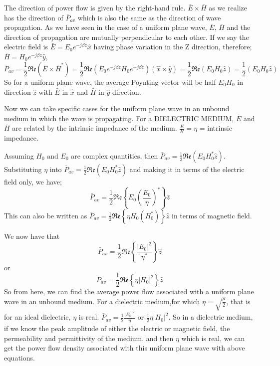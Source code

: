 The direction of power flow is given by the right-hand rule. $ \bar{E}\times\bar{H} $ as we realize has the direction of $ \bar{P}_{av} $ which is also the same as the direction of wave propagation. As we have seen in the case of a uniform plane wave, $ \bar{E} $, $ \bar{H} $ and the direction of propagation are mutually perpendicular to each other. If we say the electric field is $ \bar{E}=E_0e^{-j\beta z}\hat{x} $ having phase variation in the Z direction, therefore;
$ \bar{H}=H_0e^{-j\beta z}\hat{y} $,
\begin{dmath*}
\bar{P}_{av}=\frac{1}{2}\mathfrak{Re}(\bar{E}\times\bar{H}^{*})
=\frac{1}{2}\mathfrak{Re}(E_0e^{-j\beta z}H_0e^{+j\beta z})(\hat{x}\times\hat{y})
=\frac{1}{2}\mathfrak{Re}(E_0H_0\hat{z})=\frac{1}{2}(E_0H_0\hat{z}) 
\end{dmath*}
So for a uniform plane wave, the average Poynting vector will be half $ E_0H_0 $ in direction $ \hat{z} $ with $ \bar{E} $ in $ \hat{x} $ and $ \bar{H} $ in $ \hat{y} $ direction.

Now we can take specific cases for the uniform plane wave in an unbound medium in which the wave is propagating. For a DIELECTRIC MEDIUM, $ \bar{E} $ and $ \bar{H} $ are related by the intrinsic impedance of the medium.
$ \frac{E}{H}=\eta $ = intrinsic impedance.

Assuming $H_{0} \text{ and } E_{0}$ are complex quantities, then $\bar{P}_{av}=\frac{1}{2} \mathfrak{Re}(E_0H_0^{*}\hat{z}) $. Substituting $\eta$ into $ \bar{P}_{av}=\frac{1}{2} \mathfrak{Re}(E_0H_0^{*}\hat{z}) $ and making it in terms of the electric field only,  we have;
\begin{dmath*}
\bar{P}_{av}=\frac{1}{2} \mathfrak{Re}\left\{E_0(\frac{E_0}{\eta})^{*}\right\}\hat{z}  
\end{dmath*}
This can also be written as $ \bar{P}_{av}= \frac{1}{2}\mathfrak{Re}\left\{\eta H_0(H_0^{*})\right\}\hat{z} $ in terms of magnetic field.

We now have that 
\begin{dmath*}
\bar{P}_{av}=\frac{1}{2}\mathfrak{Re}\left\{\frac{|E_0|^{2}}{\eta^{*}}\right\}\hat{z}
\end{dmath*}
or 
\begin{dmath}
\bar{P}_{av}=\frac{1}{2}\mathfrak{Re}\left\{\eta|H_0|^{2}\right\}\hat{z}
\end{dmath}
So from here, we can find the average power flow associated with a uniform plane wave in an unbound medium. For a dielectric medium,for which $ \eta=\sqrt{\frac{\mu}{2}} $, that is for an ideal dielectric, $ \eta $ is real.
$ \bar{P}_{av}=\frac{1}{2}\frac{|E_0|^{2}}{\eta} $ or $ \frac{1}{2}\eta|H_0|^{2} $. So in a dielectric medium, if we know the peak amplitude of either the electric or magnetic field, the permeability and permittivity of the medium, and then $ \eta $ which is real, we can get the power flow density associated with this uniform plane wave with above equations.

